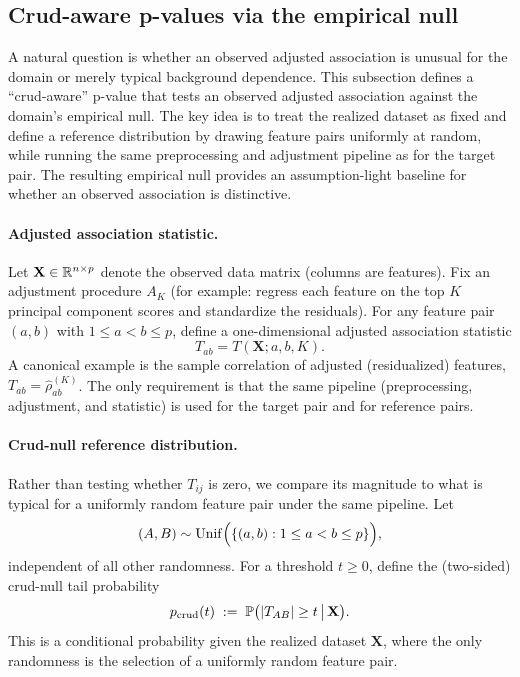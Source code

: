 \subsection{Crud-aware p-values via the empirical null}
\label{app:crud-aware-pvalues}

A natural question is whether an observed adjusted association is unusual for the domain or merely typical background dependence.
This subsection defines a ``crud-aware'' p-value that tests an observed adjusted association against the domain's empirical null. The key idea is to treat the realized dataset as fixed and define a reference distribution by drawing feature pairs uniformly at random, while running the same preprocessing and adjustment pipeline as for the target pair.
The resulting empirical null provides an assumption-light baseline for whether an observed association is distinctive.

\paragraph{Adjusted association statistic.}
Let $\mathbf{X}\in\mathbb{R}^{n\times p}$ denote the observed data matrix (columns are features). Fix an adjustment procedure $A_K$ (for example: regress each feature on the top $K$ principal component scores and standardize the residuals). For any feature pair $(a,b)$ with $1\le a<b\le p$, define a one-dimensional adjusted association statistic
\begin{equation}
T_{ab}=T(\mathbf{X};a,b,K).
\end{equation}
A canonical example is the sample correlation of adjusted (residualized) features, $T_{ab}=\widehat{\rho}^{(K)}_{ab}$. The only requirement is that the same pipeline (preprocessing, adjustment, and statistic) is used for the target pair and for reference pairs.

\paragraph{Crud-null reference distribution.}
Rather than testing whether $T_{ij}$ is zero, we compare its magnitude to what is typical for a uniformly random feature pair under the same pipeline. Let
\begin{equation}
(A,B)\sim \mathrm{Unif}\Bigl(\{(a,b): 1\le a<b\le p\}\Bigr),
\end{equation}
independent of all other randomness. For a threshold $t\ge 0$, define the (two-sided) crud-null tail probability
\begin{equation}
p_{\mathrm{crud}}(t)\;:=\;\mathbb{P}\bigl(|T_{AB}|\ge t \,\big|\, \mathbf{X}\bigr).
\end{equation}
This is a conditional probability given the realized dataset $\mathbf{X}$, where the only randomness is the selection of a uniformly random feature pair.

